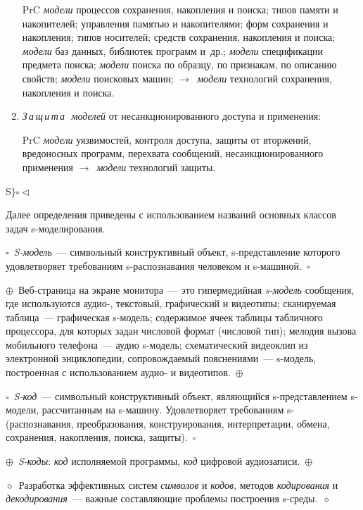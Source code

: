 \begin{multicols}{2}
\begin{enumerate}[1.]
PrC \textit{модели} процессов сохранения, накопления и поиска; типов памяти и
накопителей; управ\-ле\-ния памятью и накопителями; форм сохранения и
накопления; типов носителей; средств сохранения, накопления и поиска;
\textit{модели} баз данных, библиотек программ и~др.; \textit{модели}
спецификации предмета поиска; \textit{модели} поиска по образцу, по
признакам, по описанию свойств; \textit{модели} поисковых машин;
$\rightarrow$~\textit{модели} технологий сохранения, накопления и поиска.
\item \textit{З\,а\,щ\,и\,т\,а\,\ моделей} от несанкционированного доступа и
применения:

PrC \textit{модели} уязвимостей, контроля доступа, защиты от вторжений, 
вредоносных программ, перехвата сообщений, несанкционированного применения 
$\rightarrow$~\textit{модели} технологий защиты.
\end{enumerate}
\noindent S$\}\square\triangleleft$


Далее определения приведены с использованием названий основных классов задач  
s-мо\-де\-ли\-ро\-ва\-ния.

\noindent
$\square$~\textit{S-модель}~--- символьный конструктивный объект,
s-представление которого удовлетворяет требованиям s-распознавания
человеком и s-машиной.~$\square$

\noindent $\oplus$~Веб-страница на экране монитора~--- это гипермедийная 
\textit{s-модель} сообщения, где используются аудио-, текстовый, графический и 
видеотипы; сканируемая таблица~--- графическая s-модель; содержимое ячеек 
таблицы табличного процессора, для которых задан числовой формат (числовой 
тип); мелодия вызова мобильного телефона~--- аудио\linebreak
 s-мо\-дель; 
схематический видеоклип из электронной энциклопедии, сопровождаемый 
пояснениями~--- s-модель, построенная с использованием аудио- и 
видеотипов.~$\oplus$

\noindent $\square$~\textit{S-код}~--- символьный конструктивный объект, 
являющийся s-пред\-став\-ле\-ни\-ем s-мо\-де\-ли, рассчитанным на s-ма\-ши\-ну. 
Удовлетворяет требованиям s-(рас\-по\-зна\-ва\-ния, преобразования, 
конструирования, интерпретации, обмена, сохранения, накопления, поиска, 
защиты).~$\square$

\noindent
$\oplus$~\textit{S-коды}: \textit{код} исполняемой программы, \textit{код}
цифровой аудиозаписи.~$\oplus$

\noindent
$\diamond$~Разработка эффективных систем \textit{символов} и
\textit{кодов}, методов \textit{кодирования} и \textit{декодирования}~--- важные
составляющие проблемы построения s-среды.~$\diamond$


\end{multicols}
